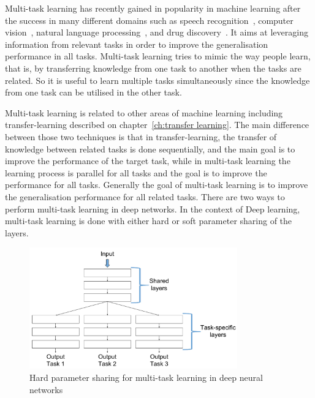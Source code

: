 Multi-task learning has recently gained in popularity in machine learning after the success in many different domains such as speech recognition~\cite{deng2013new}, computer vision~\cite{girshick2015fast}, natural language processing~\cite{collobert2008unified}, and drug discovery~\cite{ramsundar2015massively}. It aims at leveraging information from relevant tasks in order to improve the generalisation performance in all tasks. Multi-task learning tries to mimic the way people learn, that is, by transferring knowledge from one task to another when the tasks are related. So it is useful to learn multiple tasks simultaneously since the knowledge from one task can be utilised in the other task.

Multi-task learning is related to other areas of machine learning including transfer-learning described on chapter~\ref{ch:transfer learning}. The main difference between those two techniques is that in transfer-learning, the transfer of knowledge between related tasks is done sequentially, and the main goal is to improve the performance of the target task, while in multi-task learning the learning process is parallel for all tasks and the goal is to improve the performance for all tasks. Generally the goal of multi-task learning is to improve the generalisation performance for all related tasks. There are two ways to perform multi-task learning in deep networks. In the context of Deep learning, multi-task learning is done with either hard or soft parameter sharing of the layers.

\begin{figure}[H]
    \begin{center}
    \includegraphics[width=0.8\textwidth]{images/multitask_learning_hard.pdf}
    \end{center}
    \caption{Hard parameter sharing for multi-task learning in deep neural networks} \label{fig:multitask_learning_hard}
\end{figure}

